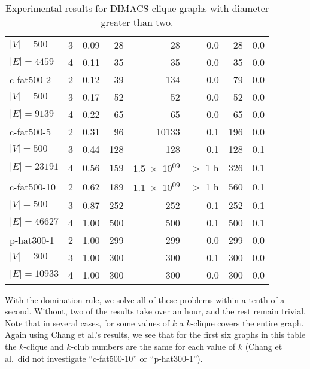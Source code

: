 \documentclass[letterpaper]{article}
\begin{document}
\begin{table}
\begin{tabular}{l c rr rr rr}
\hspace*{0.2em}\color{gray}$|V|{=}500$& 3&0.09&28&28&0.0&28&0.0\\
\hspace*{0.2em}\color{gray}$|E|{=}4459$& 4&0.11&35&35&0.0&35&0.0\\
c-fat500-2  & 2&0.12&39&134&0.0&79&0.0\\
\hspace*{0.2em}\color{gray}$|V|{=}500$& 3&0.17&52&52&0.0&52&0.0\\
\hspace*{0.2em}\color{gray}$|E|{=}9139$& 4&0.22&65&65&0.0&65&0.0\\
c-fat500-5  & 2&0.31&96&10133&0.1&196&0.0\\
\hspace*{0.2em}\color{gray}$|V|{=}500$& 3&0.44&128&128&0.1&128&0.1\\
\hspace*{0.2em}\color{gray}$|E|{=}23191$& 4&0.56&159&\color{gray}\num{1.5e+09}&\color{gray}$>$ 1 h&326&0.1\\
c-fat500-10  & 2&0.62&189&\color{gray}\num{1.1e+09}&\color{gray}$>$ 1 h&560&0.1\\
\hspace*{0.2em}\color{gray}$|V|{=}500$& 3&0.87&252&252&0.1&252&0.1\\
\hspace*{0.2em}\color{gray}$|E|{=}46627$& 4&1.00&500&500&0.1&500&0.1\\
p-hat300-1  & 2&1.00&299&299&0.0&299&0.0\\
\hspace*{0.2em}\color{gray}$|V|{=}300$& 3&1.00&300&300&0.1&300&0.0\\
\hspace*{0.2em}\color{gray}$|E|{=}10933$& 4&1.00&300&300&0.0&300&0.0\\
    \bottomrule
\end{tabular}
\caption{Experimental results for DIMACS clique graphs with diameter greater
    than two.}\label{table:clique}
\end{table}

With the domination rule, we solve all of these problems within a tenth of a second. Without, two of
the results take over an hour, and the rest remain trivial. Note that in several cases, for some
values of $k$ a $k$-clique covers the entire graph.  Again using Chang et al.'s results, we see that for the first six graphs in this table the $k$-clique and $k$-club
numbers are the same for each value of $k$ (Chang et al.\ did not investigate ``c-fat500-10'' or
``p-hat300-1'').
\end{document}
